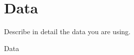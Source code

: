 \section{Data}
\label{sec:data}
Describe in detail the data you are using.

Data~\cite{baillard2011efigi}